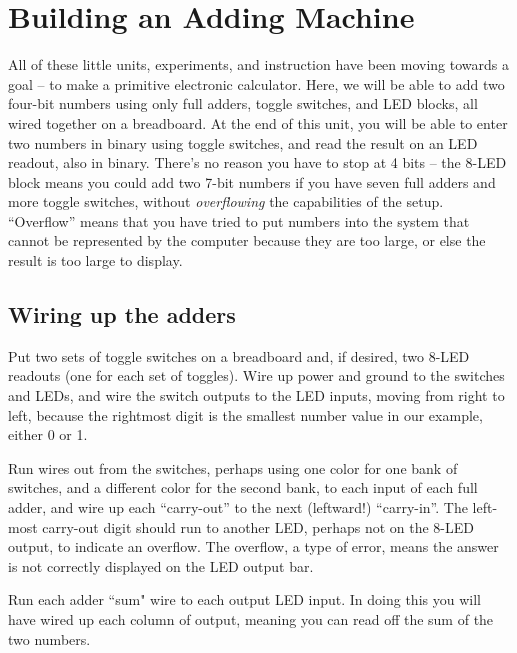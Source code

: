 \section{Building an Adding Machine}
All of these little units, experiments, and instruction have been moving towards a goal -- to make a primitive electronic calculator. Here, we will be able to add two four-bit numbers using only full adders, toggle switches, and LED blocks, all wired together on a breadboard. At the end of this unit, you will be able to enter two numbers in binary using toggle switches, and read the result on an LED readout, also in binary. There's no reason you have to stop at 4 bits -- the 8-LED block means you could add two 7-bit numbers if you have seven full adders and more toggle switches, without \emph{overflowing} the capabilities of the setup. ``Overflow'' means that you have tried to put numbers into the system that cannot be represented by the computer because they are too large, or else the result is too large to display. 

\subsection*{Wiring up the adders}

Put two sets of toggle switches on a breadboard and, if desired, two 8-LED readouts (one for each set of toggles). Wire up power and ground to the switches and LEDs, and wire the switch outputs to the LED inputs, moving from right to left, because the rightmost digit is the smallest number value in our example, either 0 or 1.

Run wires out from the switches, perhaps using one color for one bank of switches, and a different color for the second bank, to each input of each full adder, and wire up each ``carry-out'' to the next (leftward!) ``carry-in''. The left-most carry-out digit should run to another LED, perhaps not on the 8-LED output, to indicate an overflow. The overflow, a type of error, means the answer is not correctly displayed on the LED output bar.

Run each adder ``sum" wire to each output LED input. In doing this you will have wired up each column of output, meaning you can read off the sum of the two numbers.



